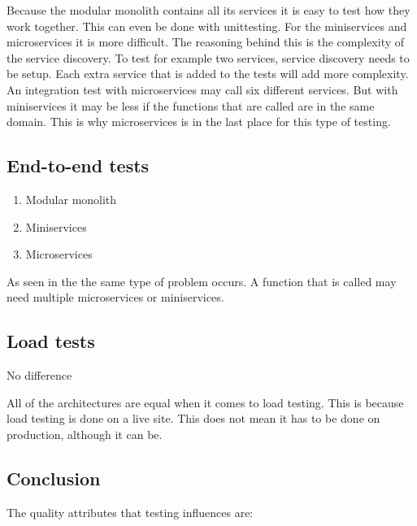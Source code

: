 Because the modular monolith contains all its services it is easy to test how they work together. This can even be done with unittesting. For the miniservices and microservices it is more difficult. The reasoning behind this is the complexity of the service discovery. To test for example two services, service discovery needs to be setup. Each extra service that is added to the tests will add more complexity. An integration test with microservices may call six different services. But with miniservices it may be less if the functions that are called are in the same domain. This is why microservices is in the last place for this type of testing.

\subsection{End-to-end tests}

\begin{enumerate}
        \item Modular monolith
        \item Miniservices
        \item Microservices
\end{enumerate}

As seen in the  the same type of problem occurs. A function that is called may need multiple microservices or miniservices.

\subsection{Load tests}

No difference

All of the architectures are equal when it comes to load testing. This is because load testing is done on a live site. This does not mean it has to be done on production, although it can be.

\subsection{Conclusion}

The quality attributes that testing influences are:

